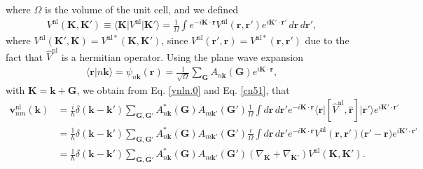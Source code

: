 where $\Omega$ is the volume of the unit cell, and we defined
\begin{align}\label{cn52}
V^\mathrm{nl}(\mathbf{K},\mathbf{K}') 
\equiv
\langle\mathbf{K}\vert V^\mathrm{nl} \vert\mathbf{K}'\rangle
= \frac{1}{\Omega} \int e^{-i\mathbf{K}\cdot\mathbf{r}} V^\mathrm{nl}(\mathbf{r},\mathbf{r}') e^{i\mathbf{K}'\cdot\mathbf{r}'} \,d\mathbf{r}\,d\mathbf{r}',
\end{align}
where 
$V^\mathrm{nl}(\mathbf{K}',\mathbf{K}) =V^{\mathrm{nl} *}(\mathbf{K},\mathbf{K}')$, since $V^\mathrm{nl}(\mathbf{r}',\mathbf{r})=V^{\mathrm{nl}*}(\mathbf{r},\mathbf{r}')$ due to the fact that $\hat V^\mathrm{nl}$ is a hermitian operator. Using the plane wave expansion
\begin{align}\label{cn3}
\langle\mathbf{r}\vert n\mathbf{k}\rangle=\psi_{n\mathbf{k}}(\mathbf{r})=\frac{1}{\sqrt{\Omega}} \sum_{\mathbf{G}} A_{n\mathbf{k}}(\mathbf{G})e^{i\mathbf{K}\cdot\mathbf{r}} ,
\end{align}
with $\mathbf{K}=\mathbf{k}+\mathbf{G}$, we obtain from Eq. \eqref{vnln.0} and Eq. \eqref{cn51}, that
\begin{align}\label{vnln.2}
\mathbf{v}^\mathrm{nl}_{nm}(\mathbf{k})
&= \frac{i}{\hbar} \delta(\mathbf{k}-\mathbf{k}') \sum_{\mathbf{G},\mathbf{G}'} A^{*}_{n\mathbf{k}}(\mathbf{G}) A_{m\mathbf{k}'}(\mathbf{G}') \frac{1}{\Omega} \int d\mathbf{r}\,d\mathbf{r}'e^{-i\mathbf{K}\cdot\mathbf{r}} \langle\mathbf{r}\vert [\hat{V}^\mathrm{nl},\hat{\mathbf{r}}] \vert\mathbf{r}'\rangle e^{i\mathbf{K}'\cdot\mathbf{r}'} \nonumber\\ 
&= \frac{1}{\hbar} \delta(\mathbf{k}-\mathbf{k}') \sum_{\mathbf{G},\mathbf{G}'} A^{*}_{n\mathbf{k}}(\mathbf{G}) A_{m\mathbf{k}'}(\mathbf{G}') \frac{i}{\Omega} \int d\mathbf{r}\,d\mathbf{r}'e^{-i\mathbf{K}\cdot\mathbf{r}} V^\mathrm{nl}(\mathbf{r},\mathbf{r}') \big(\mathbf{r}'-\mathbf{r}\big) e^{i\mathbf{K}'\cdot\mathbf{r}'} \nonumber\\
&= \frac{1}{\hbar} \delta(\mathbf{k}-\mathbf{k}') \sum_{\mathbf{G},\mathbf{G}'} A^{*}_{n\mathbf{k}}(\mathbf{G}) A_{m\mathbf{k}'}(\mathbf{G}') (\nabla_\mathbf{K}+\nabla_{\mathbf{K}'}) V^\mathrm{nl}(\mathbf{K},\mathbf{K}') .
\end{align}  

